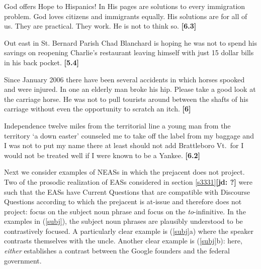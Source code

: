 \documentclass[11pt,fleqn]{article}
\newcommand{\6}{\mbox{$[\hspace*{-.6mm}[$}}
\newcommand{\9}{\mbox{$]\hspace*{-.6mm}]$}}
\newcommand{\jd}[1]{\textbf{\color{green}[jd: #1]}}
\begin{document}
\begin{exe}
\ex\label{ex1b}
\begin{xlist}

\ex God offers Hope to Hispanics! In His pages are solutions to every
immigration problem. God loves citizens and immigrants equally. His
solutions are for all of us. They are practical. They work. He is not
 to think so. \hfill {\bf [6.3]}

\ex Out east in St. Bernard Parish  Chad Blanchard is hoping he was not
 to spend his savings on reopening Charlie's restaurant
leaving himself with just 15 dollar bills in his back pocket. \hfill
{\bf [5.4]}




\ex Since January 2006  there have been several accidents in which
horses spooked and were injured. In one an elderly man broke his hip.
Please take a good look at the carriage horse. He was not 
to pull tourists around between the shafts of his carriage without even
the opportunity to scratch an itch. \hfill {\bf [6]}


\ex Independence  twelve miles from the territorial line  a young man
from the territory  `a down easter'  counseled me to take off the label
from my baggage  and I was not  to put my name there  at
least should not add Brattleboro  Vt.\  for I would not be treated well
if I were known to be a Yankee. \hfill \hfill {\bf [6.2]}

\end{xlist}
\end{exe}

Next we consider examples of NEASs in which the prejacent does not project. Two of the prosodic realization of EASs considered in section \ref{s3331}\jd{?} were such that the EASs have Current Questions that are compatible with Discourse Questions according to which the prejacent is at-issue and therefore does not project: focus on the subject noun phrase and focus on the {\em to}-infinitive. In the examples in (\ref{subj}), the subject noun phrases are plausibly understood to be contrastively focused. A particularly clear example is (\ref{subj}a) where the speaker contrasts themselves with the uncle. Another clear example is (\ref{subj}b): here, {\em either} establishes a contrast between the Google founders and the federal government.
\end{document}

